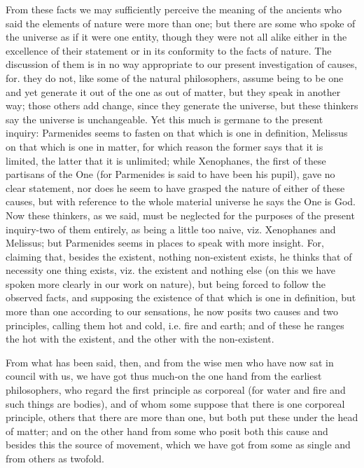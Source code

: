 \documentclass[oneside, 17pt, dvipsnames]{extbook}
\begin{document}
From these facts we may sufficiently perceive the meaning of the ancients who said the elements of nature were more than one; but there are some who spoke of the universe as if it were one entity, though they were not all alike either in the excellence of their statement or in its conformity to the facts of nature. The discussion of them is in no way appropriate to our present investigation of causes, for. they do not, like some of the natural philosophers, assume being to be one and yet generate it out of the one as out of matter, but they speak in another way; those others add change, since they generate the universe, but these thinkers say the universe is unchangeable. Yet this much is germane to the present inquiry: Parmenides seems to fasten on that which is one in definition, Melissus on that which is one in matter, for which reason the former says that it is limited, the latter that it is unlimited; while Xenophanes, the first of these partisans of the One (for Parmenides is said to have been his pupil), gave no clear statement, nor does he seem to have grasped the nature of either of these causes, but with reference to the whole material universe he says the One is God. Now these thinkers, as we said, must be neglected for the purposes of the present inquiry-two of them entirely, as being a little too naive, viz. Xenophanes and Melissus; but Parmenides seems in places to speak with more insight. For, claiming that, besides the existent, nothing non-existent exists, he thinks that of necessity one thing exists, viz. the existent and nothing else (on this we have spoken more clearly in our work on nature), but being forced to follow the observed facts, and supposing the existence of that which is one in definition, but more than one according to our sensations, he now posits two causes and two principles, calling them hot and cold, i.e. fire and earth; and of these he ranges the hot with the existent, and the other with the non-existent.

From what has been said, then, and from the wise men who have now sat in council with us, we have got thus much-on the one hand from the earliest philosophers, who regard the first principle as corporeal (for water and fire and such things are bodies), and of whom some suppose that there is one corporeal principle, others that there are more than one, but both put these under the head of matter; and on the other hand from some who posit both this cause and besides this the source of movement, which we have got from some as single and from others as twofold.
\end{document}
